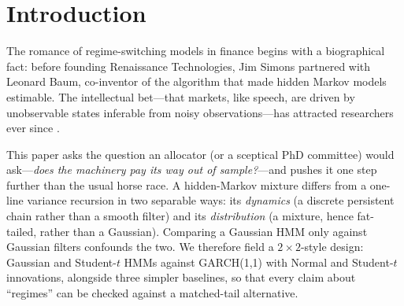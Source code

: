 \documentclass[11pt]{article}
\begin{document}
\begin{abstract}
under every forecaster yet no improvement survives a stationary-bootstrap
test. Completing the arc, we field the hybrid these results motivate:
Markov-switching GARCH \citep{haas2004} --- persistent hidden states, each
carrying its own GARCH recursion. It becomes the first model in the study to
join GARCH-$t$ in every model confidence set on every asset, matches the
$t$-pair's tail coverage (on WTI, GARCH-$t$, the $t$-HMM and MS-GARCH-$t$
are all Kupiec-accepted at all three VaR levels; MS-GARCH-$t$ alone of the
three fails the Christoffersen independence test, at 1\%), and repairs
roughly half of the HMM's 2008 breach failure --- but it nowhere
\emph{beats} GARCH-$t$. Regime structure becomes
free once tails are fat and variance adapts; it does not become profitable.
Sophistication is not edge; the useful sophistication is a fat-tailed
innovation, and it is available for one extra parameter.
\end{abstract}

\section{Introduction}
The romance of regime-switching models in finance begins with a
biographical fact: before founding Renaissance Technologies, Jim Simons
partnered with Leonard Baum, co-inventor of the algorithm \citep{baum1970}
that made hidden Markov models estimable. The intellectual bet---that
markets, like speech, are driven by unobservable states inferable from
noisy observations---has attracted researchers ever since
\citep{hamilton1989, ryden1998, ang2002, guidolin2007, nystrup2018}.

This paper asks the question an allocator (or a sceptical PhD committee)
would ask---\emph{does the machinery pay its way out of sample?}---and
pushes it one step further than the usual horse race. A hidden-Markov
mixture differs from a one-line variance recursion in two separable ways:
its \emph{dynamics} (a discrete persistent chain rather than a smooth
filter) and its \emph{distribution} (a mixture, hence fat-tailed, rather
than a Gaussian). Comparing a Gaussian HMM only against Gaussian filters
confounds the two. We therefore field a $2\times2$-style design: Gaussian
and Student-$t$ HMMs against GARCH(1,1) with Normal and Student-$t$
innovations, alongside three simpler baselines, so that every claim about
``regimes'' can be checked against a matched-tail alternative.
\end{document}
